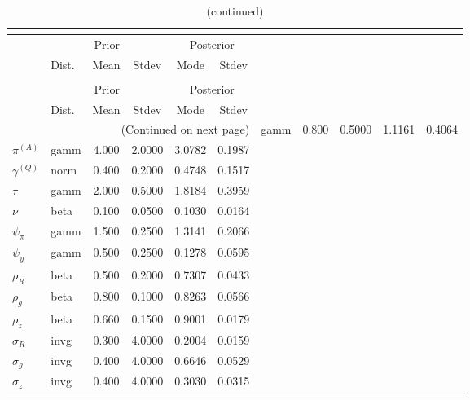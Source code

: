  
\begin{center}
\begin{longtable}{llcccc} 
\caption{Results from posterior maximization (parameters)}\\
 \label{Table:Posterior:1}\\
\toprule 
  & \multicolumn{3}{c}{Prior}  &  \multicolumn{2}{c}{Posterior} \\
  \cmidrule(r{.75em}){2-4} \cmidrule(r{.75em}){5-6}
  & Dist. & Mean  & Stdev & Mode & Stdev \\ 
\midrule \endfirsthead 
\caption{(continued)}\\
 \bottomrule 
  & \multicolumn{3}{c}{Prior}  &  \multicolumn{2}{c}{Posterior} \\
  \cmidrule(r{.75em}){2-4} \cmidrule(r{.75em}){5-6}
  & Dist. & Mean  & Stdev & Mode & Stdev \\ 
\midrule \endhead 
\bottomrule \multicolumn{6}{r}{(Continued on next page)}\endfoot 
\bottomrule\endlastfoot 
${r_{A}}$ & gamm &   0.800 & 0.5000 &   1.1161 &  0.4064 \\ 
${\pi^{(A)}}$ & gamm &   4.000 & 2.0000 &   3.0782 &  0.1987 \\ 
${\gamma^{(Q)}}$ & norm &   0.400 & 0.2000 &   0.4748 &  0.1517 \\ 
${\tau}$ & gamm &   2.000 & 0.5000 &   1.8184 &  0.3959 \\ 
${\nu}$ & beta &   0.100 & 0.0500 &   0.1030 &  0.0164 \\ 
${\psi_\pi}$ & gamm &   1.500 & 0.2500 &   1.3141 &  0.2066 \\ 
${\psi_y}$ & gamm &   0.500 & 0.2500 &   0.1278 &  0.0595 \\ 
${\rho_R}$ & beta &   0.500 & 0.2000 &   0.7307 &  0.0433 \\ 
${\rho_{g}}$ & beta &   0.800 & 0.1000 &   0.8263 &  0.0566 \\ 
${\rho_z}$ & beta &   0.660 & 0.1500 &   0.9001 &  0.0179 \\ 
${\sigma_R}$ & invg &   0.300 & 4.0000 &   0.2004 &  0.0159 \\ 
${\sigma_{g}}$ & invg &   0.400 & 4.0000 &   0.6646 &  0.0529 \\ 
${\sigma_z}$ & invg &   0.400 & 4.0000 &   0.3030 &  0.0315 \\ 
\end{longtable}
 \end{center}
